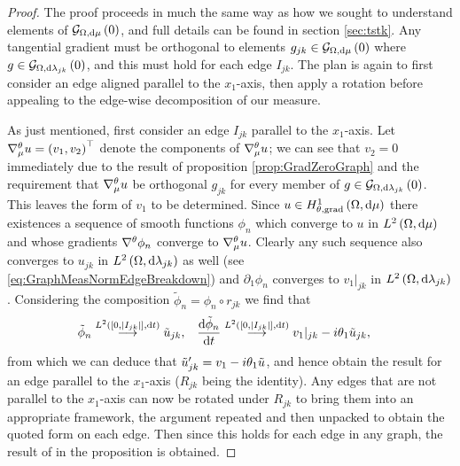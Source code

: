 \begin{proof}
	The proof proceeds in much the same way as how we sought to understand elements of $\mathcal{G}_{ \Omega, \mathrm{d}\mu}\left( 0 \right)$, and full details can be found in section \ref{sec:tstk}.
	Any tangential gradient must be orthogonal to elements $g_{jk}\in\mathcal{G}_{ \Omega, \mathrm{d}\mu}\left( 0 \right)$ where $g\in\mathcal{G}_{ \Omega, \mathrm{d}\lambda_{jk}}\left( 0 \right)$, and this must hold for each edge $I_{jk}$.
	The plan is again to first consider an edge aligned parallel to the $x_1$-axis, then apply a rotation before appealing to the edge-wise decomposition of our measure. \newline
	
	As just mentioned, first consider an edge $I_{jk}$ parallel to the $x_1$-axis. 
	Let $\nabla^{\theta}_\mu u = \left( v_1, v_2 \right)^\top$ denote the components of $\nabla^{\theta}_\mu u$; we can see that $v_2=0$ immediately due to the result of proposition \ref{prop:GradZeroGraph} and the requirement that $\nabla^{\theta}_\mu u$ be orthogonal $g_{jk}$ for every member of $g\in\mathcal{G}_{ \Omega, \mathrm{d}\lambda_{jk}}\left( 0 \right)$.
	This leaves the form of $v_1$ to be determined.
	Since $u\in H^1_{\theta, \mathrm{grad}}\left( \Omega, \mathrm{d}\mu \right)$ there existences a sequence of smooth functions $\phi_n$ which converge to $u$ in $L^{2}\left( \Omega,\mathrm{d}\mu \right)$ and whose gradients $\nabla^{\theta}\phi_n$ converge to $\nabla^{\theta}_\mu u$.
	Clearly any such sequence also converges to $u_{jk}$ in $L^{2}\left( \Omega,\mathrm{d}\lambda_{jk} \right)$ as well (see \eqref{eq:GraphMeasNormEdgeBreakdown}) and $\partial_1\phi_n$ converges to $v_1\vert_{jk}$ in $L^{2}\left( \Omega,\mathrm{d}\lambda_{jk} \right)$.
	Considering the composition $\tilde{\phi}_n = \phi_n \circ r_{jk}$ we find that
	\begin{align*}
		\tilde{\phi}_n \overset{L^{2}\left( \left[ 0,\left\lvert I_{jk} \right\rvert \right],\mathrm{d}t \right)}{\longrightarrow} \tilde{u}_{jk},
		&\quad \dfrac{\mathrm{d}\tilde{\phi}_n}{\mathrm{d}t} \overset{L^{2}\left( \left[ 0,\left\lvert I_{jk} \right\rvert \right],\mathrm{d}t \right)}{\longrightarrow} v_1\vert_{jk} - i\theta_1 \tilde{u}_{jk},
	\end{align*}
	from which we can deduce that $\tilde{u}_{jk}' = v_1 - i\theta_1\tilde{u}$, and hence obtain the result for an edge parallel to the $x_1$-axis ($R_{jk}$ being the identity).
	Any edges that are not parallel to the $x_1$-axis can now be rotated under $R_{jk}$ to bring them into an appropriate framework, the argument repeated and then unpacked to obtain the quoted form on each edge.
	Then since this holds for each edge in any graph, the result of in the proposition is obtained.
\end{proof}

